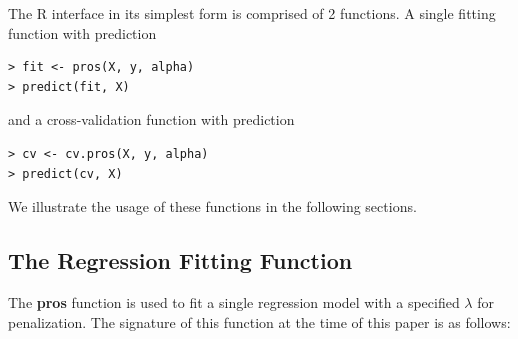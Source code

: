\documentclass[article]{jss}
\numberwithin{equation}{section}
\begin{document}
The R interface in its simplest form is comprised of 2 functions.
A single fitting function with prediction

\begin{verbatim}
> fit <- pros(X, y, alpha)
> predict(fit, X)
\end{verbatim}

and a cross-validation function with prediction

\begin{verbatim}
> cv <- cv.pros(X, y, alpha)
> predict(cv, X)
\end{verbatim}

We illustrate the usage of these functions in the following sections.

\subsection{The Regression Fitting Function}

The \textbf{pros} function is used to fit a single regression model with a specified $\lambda$ for penalization. The signature of this function at the time of this paper is as follows:
\end{document}
